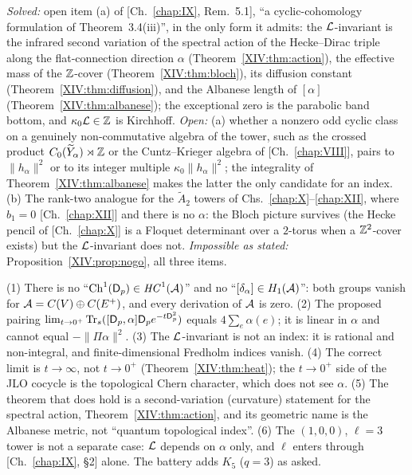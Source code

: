 \begin{remark}\label{XIV:rem:scope}
\begin{sloppypar}
\emph{Solved:} open item (a) of [Ch.~\ref{chap:IX}, Rem.~5.1], ``a cyclic-cohomology formulation of
Theorem~3.4(iii)'', in the only form it admits: the $\mathcal{L}$-invariant is the infrared second
variation of the spectral action of the Hecke--Dirac triple along the flat-connection
direction $\alpha$ (Theorem~\ref{XIV:thm:action}), the effective mass of the $\mathbb{Z}$-cover
(Theorem~\ref{XIV:thm:bloch}), its diffusion constant (Theorem~\ref{XIV:thm:diffusion}), and the
Albanese length of $[\alpha]$ (Theorem~\ref{XIV:thm:albanese}); the exceptional zero is the
parabolic band bottom, and $\kappa_0\mathcal{L}\in\mathbb{Z}$ is Kirchhoff. \emph{Open:} (a) whether a
nonzero odd cyclic class on a genuinely non-commutative algebra of the tower, such as the
crossed product $C_0(\widetilde Y_\alpha)\rtimes\mathbb{Z}$ or the Cuntz--Krieger algebra of [Ch.~\ref{chap:VIII}],
pairs to $\|h_\alpha\|^{2}$ or to its integer multiple $\kappa_0\|h_\alpha\|^{2}$; the
integrality of Theorem~\ref{XIV:thm:albanese} makes the latter the only candidate for an index.
(b) The rank-two analogue for the $\widetilde A_2$ towers of Chs.~\ref{chap:X}--\ref{chap:XII}, where $b_1=0$ [Ch.~\ref{chap:XII}]
and there is no $\alpha$: the Bloch picture survives (the Hecke pencil of [Ch.~\ref{chap:X}] is a Floquet
determinant over a $2$-torus when a $\mathbb{Z}^{2}$-cover exists) but the $\mathcal{L}$-invariant does not.
\emph{Impossible as stated:} Proposition~\ref{XIV:prop:nogo}, all three items.
\end{sloppypar}
\end{remark}

\begin{remark}\label{XIV:rem:corrections}
(1) There is no ``$\mathrm{Ch}^{1}(\mathsf{D}_p)\in\mathit{HC}^{1}(\mathcal{A})$'' and no ``$[\delta_\alpha]\in H_1(\mathcal{A})$'':
both groups vanish for $\mathcal{A}=C(V)\oplus C(E^{+})$, and every derivation of $\mathcal{A}$ is zero.
(2) The proposed pairing $\lim_{t\to0^{+}}\operatorname{Tr}_s([\mathsf{D}_p,\alpha]\mathsf{D}_p e^{-t\mathsf{D}_p^{2}})$ equals
$4\sum_e\alpha(e)$; it is linear in $\alpha$ and cannot equal $-\|\Pi\alpha\|^{2}$. (3) The
$\mathcal{L}$-invariant is not an index: it is rational and non-integral, and finite-dimensional
Fredholm indices vanish. (4) The correct limit is $t\to\infty$, not $t\to0^{+}$
(Theorem~\ref{XIV:thm:heat}); the $t\to0^{+}$ side of the JLO cocycle is the topological Chern
character, which does not see $\alpha$. (5) The theorem that does hold is a second-variation
(curvature) statement for the spectral action, Theorem~\ref{XIV:thm:action}, and its
geometric name is the Albanese metric, not ``quantum topological index''. (6) The
$(1,0,0)$, $\ell=3$ tower is not a separate case: $\mathcal{L}$ depends on $\alpha$ only, and
$\ell$ enters through [Ch.~\ref{chap:IX}, \S2] alone. The battery adds $K_5$ ($q=3$) as asked.
\end{remark}

